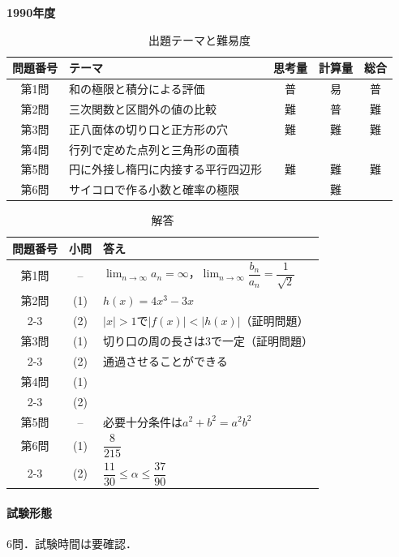 \documentclass[../../main.tex]{subfiles}
\begin{document}
\begin{center}
  {\fontsize{48pt}{58pt}\selectfont \textbf{1990}\normalsize\textbf{年度}}
\end{center}

\begin{table}[htb]
  \centering
  \caption{出題テーマと難易度}
  \begin{tabular}{|c|p{6.2cm}|c|c|c|}
    \hline
    \textbf{問題番号} & \textbf{テーマ} & \textbf{思考量} & \textbf{計算量} & \textbf{総合} \\
    \hline
    第1問 & 和の極限と積分による評価 & 普 & 易 & 普 \\
    \hline
    第2問 & 三次関数と区間外の値の比較 & 難 & 普 & 難 \\
    \hline
    第3問 & 正八面体の切り口と正方形の穴 & 難 & 難 & 難 \\
    \hline
    第4問 & 行列で定めた点列と三角形の面積 &  &  &  \\
    \hline
    第5問 & 円に外接し楕円に内接する平行四辺形 & 難 & 難 & 難 \\
    \hline
    第6問 & サイコロで作る小数と確率の極限 &  & 難 &  \\
    \hline
  \end{tabular}
\end{table}

\begin{table}[htb]
  \centering
  \caption{解答}
  \renewcommand{\arraystretch}{1.4}
  \begin{tabular}{|c|c|p{9cm}|}
    \hline
    \textbf{問題番号} & \textbf{小問} & \textbf{答え} \\
    \hline
    第1問 & -- & $\displaystyle\lim_{n\to\infty}a_n=\infty$，$\displaystyle\lim_{n\to\infty}\dfrac{b_n}{a_n}=\dfrac{1}{\sqrt{2}}$ \\
    \hline
    第2問 & (1) & $h(x)=4x^3-3x$ \\
    \cline{2-3}
    & (2) & $|x|>1$で$|f(x)|<|h(x)|$（証明問題） \\
    \hline
    第3問 & (1) & 切り口の周の長さは$3$で一定（証明問題） \\
    \cline{2-3}
    & (2) & 通過させることができる \\
    \hline
    第4問 & (1) & \\
    \cline{2-3}
    & (2) & \\
    \hline
    第5問 & -- & 必要十分条件は$a^2+b^2=a^2b^2$ \\
    \hline
    第6問 & (1) & $\dfrac{8}{215}$ \\
    \cline{2-3}
    & (2) & $\dfrac{11}{30}\le\alpha\le\dfrac{37}{90}$ \\
    \hline
  \end{tabular}
\end{table}

\paragraph{試験形態}
6問．試験時間は要確認．
\end{document}
